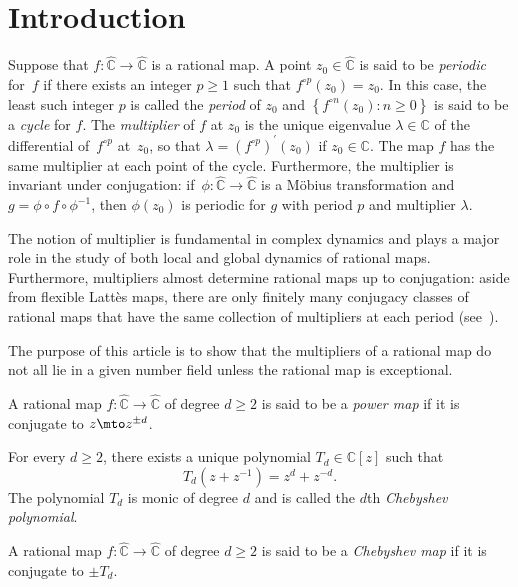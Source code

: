 \Changel

\section{Introduction}

Suppose that $f \colon \widehat{\mathbb{C}} \to \widehat{\mathbb{C}}$ is a rational map. A point $z_{0} \in \widehat{\mathbb{C}}$ is said to be \emph{periodic} for~$f$ if there exists an integer $p \geq 1$ such that $f^{\circ p}(z_{0}) = z_{0}$. In this case, the least such integer $p$ is called the \emph{period} of $z_{0}$ and $\left\lbrace f^{\circ n}(z_{0}) : n \geq 0 \right\rbrace$ is said to be a \emph{cycle} for $f$. The \emph{multiplier} of $f$ at $z_{0}$ is the unique eigenvalue $\lambda \in \mathbb{C}$ of the differential of~$f^{\circ p}$ at~$z_{0}$, so that $\lambda = \left(f^{\circ p} \right)^{\prime}(z_{0})$ if $z_{0} \in \mathbb{C}$. The map $f$ has the same multiplier at each point of the cycle. Furthermore, the multiplier is invariant under conjugation: if~$\phi \colon \widehat{\mathbb{C}} \to \widehat{\mathbb{C}}$ is a Möbius transformation and $g = \phi \circ f \circ \phi^{-1}$, then $\phi(z_{0})$ is periodic for $g$ with period $p$ and multiplier $\lambda$.

The notion of multiplier is fundamental in complex dynamics and plays a major role in the study of both local and global dynamics of rational maps. Furthermore, multipliers almost determine rational maps up to conjugation: aside from flexible Lattès maps, there are only finitely many conjugacy classes of rational maps that have the same collection of multipliers at each period (see~\cite[Cor.\,2.3]{MM1987}).

The purpose of this article is to show that the multipliers of a rational map do not all lie in a given number field unless the rational map is exceptional.

\begin{definition}
A rational map $f \colon \widehat{\mathbb{C}} \to \widehat{\mathbb{C}}$ of degree $d \geq 2$ is said to be a \emph{power map} if it is conjugate to $z \mto z^{\pm d}$.
\end{definition}

For every $d \geq 2$, there exists a unique polynomial $T_{d} \in \mathbb{C}[z]$ such that
\[
T_{d}\left(z +z^{-1} \right) = z^{d} +z^{-d}.
\]
The polynomial $T_{d}$ is monic of degree $d$ and is called the $d$th \emph{Chebyshev polynomial}.

\begin{definition}
A rational map $f \colon \widehat{\mathbb{C}} \to \widehat{\mathbb{C}}$ of degree $d \geq 2$ is said to be a \emph{Chebyshev map} if it is conjugate to $\pm T_{d}$.
\end{definition}

